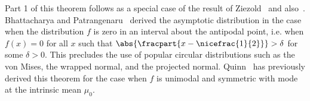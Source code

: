 \documentclass[journal]{IEEEtran}
\begin{document}
Part 1 of this theorem follows as a special case of the result of Ziezold~\cite{Ziezold_intrinsic_mean_1977} and also~\cite[Theorem 2.3(b)]{Bhattacharya_int_ext_means_2003}. Bhattacharya and Patrangenaru~\cite[Theorem 2.3]{Bhattacharya_int_ext_means_2005} derived the asymptotic distribution in the case when the distribution $f$ is zero in an interval about the antipodal point, i.e. when $f(x) = 0$ for all $x$ such that $\abs{\fracpart{x - \nicefrac{1}{2}}} > \delta$ for some $\delta > 0$.  This precludes the use of popular circular distributions such as the von Mises, the wrapped normal, and the projected normal.  Quinn~\cite{Quinn2007} has previously derived this theorem for the case when $f$ is unimodal and symmetric with mode at the intrinsic mean $\mu_0$.

\end{document}
